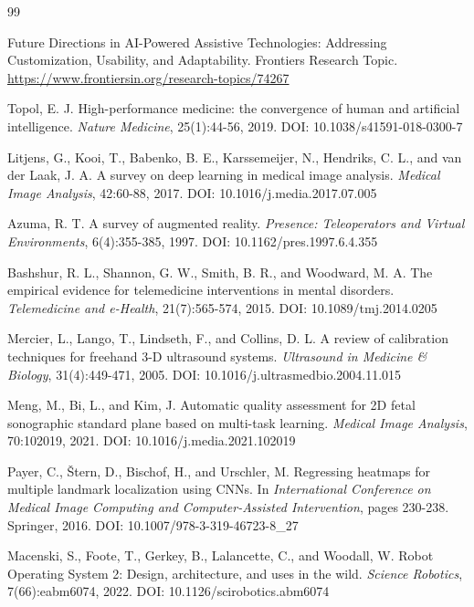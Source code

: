 \documentclass[12pt,a4paper]{article}
\begin{document}
\begin{thebibliography}{99}

Future Directions in AI-Powered Assistive Technologies: Addressing Customization, Usability, and Adaptability. Frontiers Research Topic. \url{https://www.frontiersin.org/research-topics/74267}

Topol, E. J. High-performance medicine: the convergence of human and artificial intelligence. \textit{Nature Medicine}, 25(1):44-56, 2019. DOI: 10.1038/s41591-018-0300-7

Litjens, G., Kooi, T., Babenko, B. E., Karssemeijer, N., Hendriks, C. L., and van der Laak, J. A. A survey on deep learning in medical image analysis. \textit{Medical Image Analysis}, 42:60-88, 2017. DOI: 10.1016/j.media.2017.07.005

Azuma, R. T. A survey of augmented reality. \textit{Presence: Teleoperators and Virtual Environments}, 6(4):355-385, 1997. DOI: 10.1162/pres.1997.6.4.355

Bashshur, R. L., Shannon, G. W., Smith, B. R., and Woodward, M. A. The empirical evidence for telemedicine interventions in mental disorders. \textit{Telemedicine and e-Health}, 21(7):565-574, 2015. DOI: 10.1089/tmj.2014.0205

Mercier, L., Lango, T., Lindseth, F., and Collins, D. L. A review of calibration techniques for freehand 3-D ultrasound systems. \textit{Ultrasound in Medicine \& Biology}, 31(4):449-471, 2005. DOI: 10.1016/j.ultrasmedbio.2004.11.015

Meng, M., Bi, L., and Kim, J. Automatic quality assessment for 2D fetal sonographic standard plane based on multi-task learning. \textit{Medical Image Analysis}, 70:102019, 2021. DOI: 10.1016/j.media.2021.102019

Payer, C., Štern, D., Bischof, H., and Urschler, M. Regressing heatmaps for multiple landmark localization using CNNs. In \textit{International Conference on Medical Image Computing and Computer-Assisted Intervention}, pages 230-238. Springer, 2016. DOI: 10.1007/978-3-319-46723-8\_27

Macenski, S., Foote, T., Gerkey, B., Lalancette, C., and Woodall, W. Robot Operating System 2: Design, architecture, and uses in the wild. \textit{Science Robotics}, 7(66):eabm6074, 2022. DOI: 10.1126/scirobotics.abm6074


\end{thebibliography}
\end{document}
